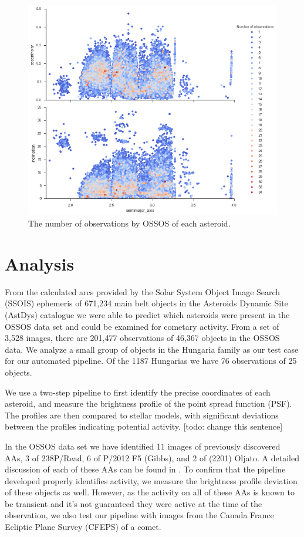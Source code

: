 \documentclass[iop,apj]{emulateapj}
\begin{document}
\begin{figure}[!htb]
    \centering
    \includegraphics[width=\linewidth]{graphs/occurance2.png}
    \caption{The number of observations by OSSOS of each asteroid.}\label{fig:6}
\end{figure}

\section{Analysis}

From the calculated arcs provided by the Solar System Object Image Search (SSOIS) ephemeris \citep{ssois} of 671,234 main belt objects in the Asteroids Dynamic Site (AstDys) catalogue \citep{astdys} we were able to predict which asteroids were present in the OSSOS data set and could be examined for cometary activity. From a set of 3,528 images, there are 201,477 observations of 46,367 objects in the OSSOS data. We analyze a small group of objects in the Hungaria family as our test case for our automated pipeline. Of the 1187 Hungarias we have 76 observations of 25 objects. 

We use a two-step pipeline to first identify the precise coordinates of each asteroid, and measure the brightness profile of the point spread function (PSF). The profiles are then compared to stellar models, with significant deviations between the profiles indicating potential activity. [todo: change this sentence]

In the OSSOS data set we have identified 11 images of previously discovered AAs, 3 of 238P/Read, 6 of P/2012 F5 (Gibbs), and 2 of (2201) Oljato.  A detailed discussion of each of these AAs can be found in \cite{jewitt15}. To confirm that the pipeline developed properly identifies activity, we measure the brightness profile deviation of these objects as well. However, as the activity on all of these AAs is known to be transient and it's not guaranteed they were active at the time of the observation, we also test our pipeline with images from the Canada France Ecliptic Plane Survey (CFEPS)  of a comet.
\end{document}

